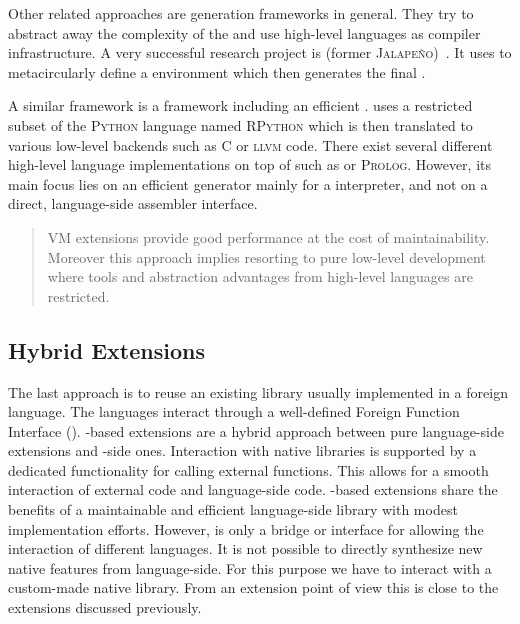 Other related approaches are \VM generation frameworks in general.
They try to abstract away the complexity of the \VM and use high-level languages as compiler infrastructure.
A very successful research project is  (former \textsc{Jalapeño})~\cite{Alpe99a}.
It uses \Java to metacircularly define a \Java environment which then generates the final \VM.

A similar framework is  \cite{Rigo06a} a \VM framework including an efficient \JIT. 
\PyPy uses a restricted subset of the  \textsc{Python} language named \textsc{RPython} which is then translated to various low-level backends such as C or \textsc{llvm} code.
There exist several different high-level language \VM implementations on top of \PyPy such as \ST \cite{Bolz08a} or \textsc{Prolog}.
However, its main focus lies on an efficient \JIT generator mainly for a \Python interpreter, and not on a direct, language-side assembler interface.


\begin{quote}
VM extensions provide good performance at the cost of maintainability. 
Moreover this approach implies resorting to pure low-level development where tools and abstraction advantages from high-level languages are restricted.
\end{quote}

\subsection{Hybrid Extensions}

The last approach is to reuse an existing library usually implemented in a foreign language.
The languages interact through a well-defined Foreign Function Interface (\FFI).
\FFI-based extensions are a hybrid approach between pure language-side extensions and \VM-side ones.
Interaction with native libraries is supported by a dedicated \VM functionality for calling external functions.
This allows for a smooth interaction of external code and language-side code.
\FFI-based extensions share the benefits of a maintainable and efficient lan\-guage-side library with modest implementation efforts.
However, \FFI is only a bridge or interface for allowing the interaction of different languages. 
It is not possible to directly synthesize new native features from language-side.
For this purpose we have to interact with a custom-made native library.
From an extension point of view this is close to the \VM extensions discussed previously.

